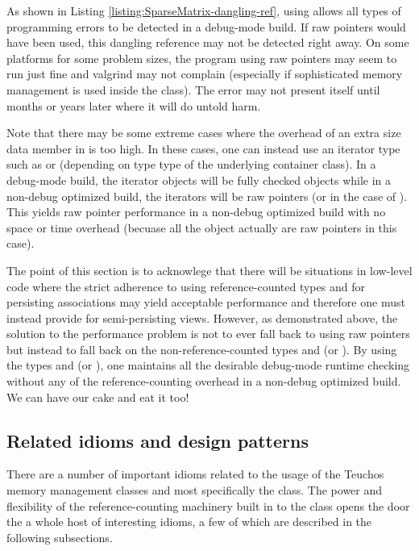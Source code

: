 \documentclass[pdf,ps2pdf,11pt]{SANDreport}
\begin{document}
As shown in Listing {}\ref{listing:SparseMatrix-dangling-ref}, using
{} allows all types of programming errors to be
detected in a debug-mode build.  If raw pointers would have been used,
this dangling reference may not be detected right away.  On some
platforms for some problem sizes, the program using raw pointers may
seem to run just fine and valgrind may not complain (especially if
sophisticated memory management is used inside the
{} class).  The error may not present itself
until months or years later where it will do untold harm.

Note that there may be some extreme cases where the overhead of an
extra size data member in {} is too high.  In these
cases, one can instead use an iterator type such as
{} or {} (depending
on type type of the underlying container class).  In a debug-mode
build, the iterator objects will be fully checked {}
objects while in a non-debug optimized build, the iterators will be
raw pointers (or {} in the case of
{}).  This yields raw pointer performance in a
non-debug optimized build with no space or time overhead (becuase all
the object actually are raw pointers in this case).

The point of this section is to acknowlege that there will be
situations in low-level code where the strict adherence to using
reference-counted types {} and {} for
persisting associations may yield acceptable performance and therefore
one must instead provide for semi-persisting views.  However, as
demonstrated above, the solution to the performance problem is not to
ever fall back to using raw pointers but instead to fall back on the
non-reference-counted types {} and {} (or
{}).  By using the types {} and
{} (or {}), one maintains all
the desirable debug-mode runtime checking without any of the
reference-counting overhead in a non-debug optimized build.  We can
have our cake and eat it too!


%
{}\subsection{Related idioms and design patterns}
%

There are a number of important idioms related to the usage of the
Teuchos memory management classes and most specifically the
{} class.  The power and flexibility of the
reference-counting machinery built in to the {} class
opens the door the a whole host of interesting idioms, a few of which
are described in the following subsections.
\end{document}
